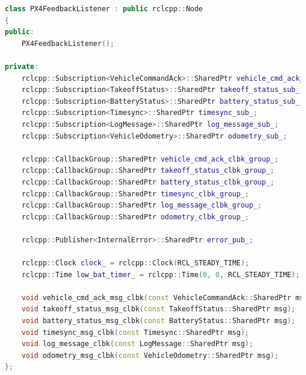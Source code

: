 \begin{lstlisting}[language=C++, caption={Definizione del nodo \emph{px4\_feedback\_listener}.}, label={lst:pflistener}]
class PX4FeedbackListener : public rclcpp::Node
{
public:
    PX4FeedbackListener();

private:
    rclcpp::Subscription<VehicleCommandAck>::SharedPtr vehicle_cmd_ack_sub_;
    rclcpp::Subscription<TakeoffStatus>::SharedPtr takeoff_status_sub_;
    rclcpp::Subscription<BatteryStatus>::SharedPtr battery_status_sub_;
    rclcpp::Subscription<Timesync>::SharedPtr timesync_sub_;
    rclcpp::Subscription<LogMessage>::SharedPtr log_message_sub_;
    rclcpp::Subscription<VehicleOdometry>::SharedPtr odometry_sub_;

    rclcpp::CallbackGroup::SharedPtr vehicle_cmd_ack_clbk_group_;
    rclcpp::CallbackGroup::SharedPtr takeoff_status_clbk_group_;
    rclcpp::CallbackGroup::SharedPtr battery_status_clbk_group_;
    rclcpp::CallbackGroup::SharedPtr timesync_clbk_group_;
    rclcpp::CallbackGroup::SharedPtr log_message_clbk_group_;
    rclcpp::CallbackGroup::SharedPtr odometry_clbk_group_;

    rclcpp::Publisher<InternalError>::SharedPtr error_pub_;

    rclcpp::Clock clock_ = rclcpp::Clock(RCL_STEADY_TIME);
    rclcpp::Time low_bat_timer_ = rclcpp::Time(0, 0, RCL_STEADY_TIME);

    void vehicle_cmd_ack_msg_clbk(const VehicleCommandAck::SharedPtr msg);
    void takeoff_status_msg_clbk(const TakeoffStatus::SharedPtr msg);
    void battery_status_msg_clbk(const BatteryStatus::SharedPtr msg);
    void timesync_msg_clbk(const Timesync::SharedPtr msg);
    void log_message_clbk(const LogMessage::SharedPtr msg);
    void odometry_msg_clbk(const VehicleOdometry::SharedPtr msg);
};
\end{lstlisting}
\clearpage

